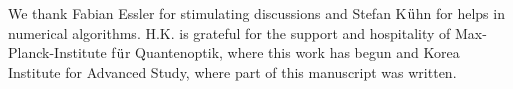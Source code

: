 \documentclass[twocolumn,superscriptaddress, prb]{revtex4-1}
\begin{document}
We thank Fabian Essler for stimulating discussions and Stefan K${\rm{\ddot u}}$hn for helps in numerical algorithms.
H.K. is grateful for the support and hospitality of Max-Planck-Institute f${\rm{\ddot u}}$r Quantenoptik,
where this work has begun and Korea Institute for Advanced Study, where part of this manuscript was written.




%
%
%
%
%
%
%
%
%
%
%
%
%
%
%
%
%
%
%
%
%
%
%
%
%
\end{document}
